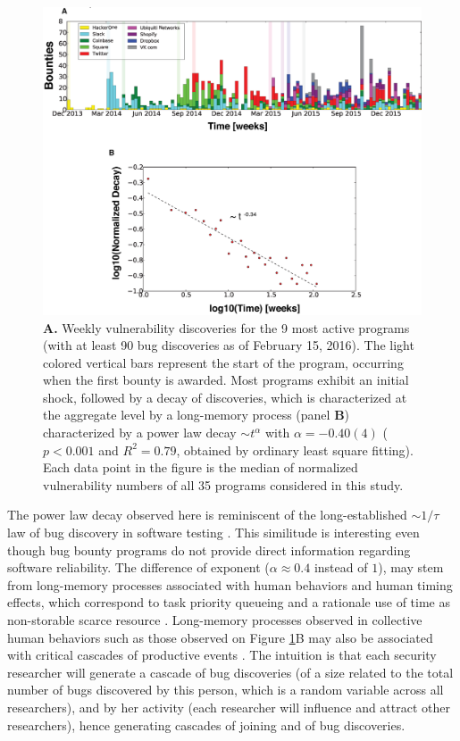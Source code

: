\begin{figure}[h]
\begin{center}
\includegraphics[width=12cm]{../figures/timeline.eps}
\caption{\footnotesize {\bf A.} Weekly vulnerability discoveries for the 9 most active programs (with at least 90 bug discoveries as of February 15, 2016). The light colored vertical bars represent the start of the program, occurring when the first bounty is awarded. Most programs exhibit an initial shock, followed by a decay of discoveries, which is characterized at the aggregate level by a long-memory process (panel {\bf B}) characterized by a power law decay $\sim t^{\alpha}$ with $\alpha = -0.40(4)$ ($p < 0.001$ and $R^2 = 0.79$, obtained by ordinary least square fitting). Each data point in the figure is the median of normalized vulnerability numbers of all 35 programs considered in this study.}
\label{timeline}
\end{center}
\end{figure}

The power law decay observed here is reminiscent of the long-established $\sim 1/\tau$ law of bug discovery in software testing \cite{adams1984textordfeminineoptimizing}. This similitude is interesting even though bug bounty programs do not provide direct information regarding software reliability. The difference of exponent ($\alpha \approx 0.4$ instead of $1$), may stem from long-memory processes associated with human behaviors and human timing effects, which correspond to task priority queueing and a rationale use of time as non-storable scarce resource \cite{maillart2011quantification}. Long-memory processes observed in collective human behaviors such as those observed on Figure \ref{timeline}B may also be associated with critical cascades of productive events \cite{sornette2014much}. The intuition is that each security researcher will generate a cascade of bug discoveries (of a size related to the total number of bugs discovered by this person, which is a random variable across all researchers), and by her activity (each researcher will influence and attract other researchers), hence generating cascades of joining and of bug discoveries.

